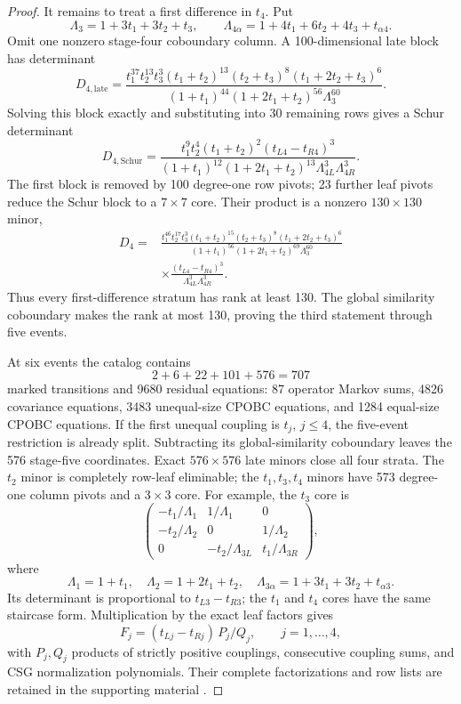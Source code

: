 \begin{proof}
It remains to treat a first difference in \(t_4\).  Put
\[
\Lambda_3=1+3t_1+3t_2+t_3,\qquad
\Lambda_{4\alpha}=1+4t_1+6t_2+4t_3+t_{\alpha4}.
\]
Omit one nonzero stage-four coboundary column.  A 100-dimensional late
block has determinant
\[
D_{4,\mathrm{late}}=
\frac{t_1^{37}t_2^{13}t_3^3(t_1+t_2)^{13}
(t_2+t_3)^8(t_1+2t_2+t_3)^6}
{(1+t_1)^{44}(1+2t_1+t_2)^{56}\Lambda_3^{60}}.
\]
Solving this block exactly and substituting into 30 remaining rows gives a
Schur determinant
\[
D_{4,\mathrm{Schur}}=
\frac{t_1^9t_2^4(t_1+t_2)^2(t_{L4}-t_{R4})^3}
{(1+t_1)^{12}(1+2t_1+t_2)^{13}
\Lambda_{4L}^3\Lambda_{4R}^3}.
\]
The first block is removed by 100 degree-one row pivots; 23 further leaf
pivots reduce the Schur block to a \(7\times7\) core.  Their product is a
nonzero \(130\times130\) minor,
\begin{equation}
\begin{split}
D_4={}&
\frac{t_1^{46}t_2^{17}t_3^3(t_1+t_2)^{15}
(t_2+t_3)^8(t_1+2t_2+t_3)^6}
{(1+t_1)^{56}(1+2t_1+t_2)^{69}\Lambda_3^{60}}\\
&\times
\frac{(t_{L4}-t_{R4})^3}
{\Lambda_{4L}^3\Lambda_{4R}^3}.
\end{split}
\label{eq:bcgr-five-t4}
\end{equation}
Thus every first-difference stratum has rank at least 130.  The global
similarity coboundary makes the rank at most 130, proving the third
statement through five events.

At six events the catalog contains
\[
2+6+22+101+576=707
\]
marked transitions and 9680 residual equations: 87 operator Markov sums,
4826 covariance equations, 3483 unequal-size CPOBC equations, and 1284
equal-size CPOBC equations.  If the first unequal coupling is
\(t_j\), \(j\le4\), the five-event restriction is already split.
Subtracting its global-similarity coboundary leaves the 576 stage-five
coordinates.  Exact \(576\times576\) late minors close all four strata.
The \(t_2\) minor is completely row-leaf eliminable; the \(t_1,t_3,t_4\)
minors have 573 degree-one column pivots and a \(3\times3\) core.  For
example, the \(t_3\) core is
\[
\begin{pmatrix}
-t_1/\Lambda_1&1/\Lambda_1&0\\
-t_2/\Lambda_2&0&1/\Lambda_2\\
0&-t_2/\Lambda_{3L}&t_1/\Lambda_{3R}
\end{pmatrix},
\]
where
\[
\Lambda_1=1+t_1,\quad
\Lambda_2=1+2t_1+t_2,\quad
\Lambda_{3\alpha}=1+3t_1+3t_2+t_{\alpha3}.
\]
Its determinant is proportional to \(t_{L3}-t_{R3}\); the \(t_1\) and
\(t_4\) cores have the same staircase form.  Multiplication by the exact
leaf factors gives
\[
F_j=(t_{Lj}-t_{Rj})\,P_j/Q_j,\qquad j=1,\ldots,4,
\]
with \(P_j,Q_j\) products of strictly positive couplings, consecutive
coupling sums, and CSG normalization polynomials.  Their complete
factorizations and row lists are retained in the supporting material
\cite{XuBellCausalGrowthRigidity2026}.


\end{proof}
